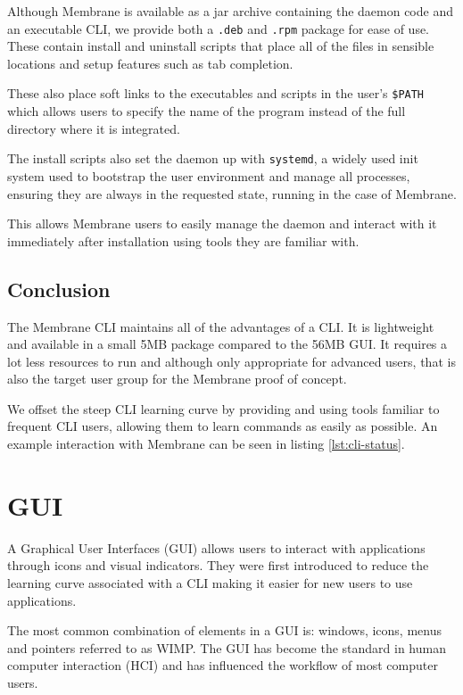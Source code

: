 \documentclass[11pt, a4paper, twocolumn, twoside]{report}
\def\code#1{\texttt{#1}}
\begin{document}
Although Membrane is available as a jar archive containing the daemon code and an executable CLI, we provide both a \code{.deb} and \code{.rpm} package for ease of use. These contain install and uninstall scripts that place all of the files in sensible locations and setup features such as tab completion.

These also place soft links to the executables and scripts in the user's \code{\$PATH} which allows users to specify the name of the program instead of the full directory where it is integrated.

The install scripts also set the daemon up with \code{systemd}, a widely used init system \citep{saunders2015systemd} used to bootstrap the user environment and manage all processes, ensuring they are always in the requested state, running in the case of Membrane.

This allows Membrane users to easily manage the daemon and interact with it immediately after installation using tools they are familiar with.

\subsection{Conclusion}

The Membrane CLI maintains all of the advantages of a CLI. It is lightweight and available in a small 5MB package compared to the 56MB GUI. It requires a lot less resources to run and although only appropriate for advanced users, that is also the target user group for the Membrane proof of concept.

We offset the steep CLI learning curve by providing and using tools familiar to frequent CLI users, allowing them to learn commands as easily as possible. An example interaction with Membrane can be seen in listing \ref{lst:cli-status}.

\section{GUI}

A Graphical User Interfaces (GUI) allows users to interact with applications through icons and visual indicators. They were first introduced to reduce the learning curve associated with a CLI \citep{linfo2004gui} making it easier for new users to use applications.

The most common combination of elements in a GUI is: windows, icons, menus and pointers referred to as WIMP. \citep{van1997post} The GUI has become the standard in human computer interaction (HCI) and has influenced the workflow of most computer users.
\end{document}
